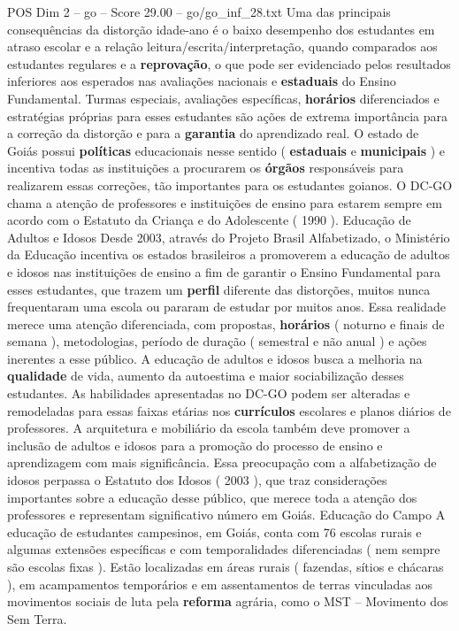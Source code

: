 \begin{textsample}{POS Dim 2 – go – Score 29.00 – go/go\_inf\_28.txt}
Uma das principais consequências da distorção idade-ano é o baixo desempenho dos estudantes em atraso escolar e a relação leitura/escrita/interpretação, quando comparados aos estudantes regulares e a \textbf{reprovação}, o que pode ser evidenciado pelos resultados inferiores aos esperados nas avaliações nacionais e \textbf{estaduais} do Ensino Fundamental.
Turmas especiais, avaliações específicas, \textbf{horários} diferenciados e estratégias próprias para esses estudantes são ações de extrema importância para a correção da distorção e para a \textbf{garantia} do aprendizado real.
O estado de Goiás possui \textbf{políticas} educacionais nesse sentido ( \textbf{estaduais} e \textbf{municipais} ) e incentiva todas as instituições a procurarem os \textbf{órgãos} responsáveis para realizarem essas correções, tão importantes para os estudantes goianos.
O DC-GO chama a atenção de professores e instituições de ensino para estarem sempre em acordo com o Estatuto da Criança e do Adolescente ( 1990 ).
Educação de Adultos e Idosos Desde 2003, através do Projeto Brasil Alfabetizado, o Ministério da Educação incentiva os estados brasileiros a promoverem a educação de adultos e idosos nas instituições de ensino a fim de garantir o Ensino Fundamental para esses estudantes, que trazem um \textbf{perfil} diferente das distorções, muitos nunca frequentaram uma escola ou pararam de estudar por muitos anos.
Essa realidade merece uma atenção diferenciada, com propostas, \textbf{horários} ( noturno e finais de semana ), metodologias, período de duração ( semestral e não anual ) e ações inerentes a esse público.
A educação de adultos e idosos busca a melhoria na \textbf{qualidade} de vida, aumento da autoestima e maior sociabilização desses estudantes.
As habilidades apresentadas no DC-GO podem ser alteradas e remodeladas para essas faixas etárias nos \textbf{currículos} escolares e planos diários de professores.
A arquitetura e mobiliário da escola também deve promover a inclusão de adultos e idosos para a promoção do processo de ensino e aprendizagem com mais significância.
Essa preocupação com a alfabetização de idosos perpassa o Estatuto dos Idosos ( 2003 ), que traz considerações importantes sobre a educação desse público, que merece toda a atenção dos professores e representam significativo número em Goiás.
Educação do Campo A educação de estudantes campesinos, em Goiás, conta com 76 escolas rurais e algumas extensões específicas e com temporalidades diferenciadas ( nem sempre são escolas fixas ).
Estão localizadas em áreas rurais ( fazendas, sítios e chácaras ), em acampamentos temporários e em assentamentos de terras vinculadas aos movimentos sociais de luta pela \textbf{reforma} agrária, como o MST – Movimento dos Sem Terra.

\end{textsample}
